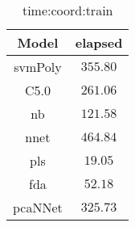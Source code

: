 \begin{table}[!ht]
	\centering
	\begin{tabular}{|c|c|}
		\hline
		Model & elapsed \\ \hline
		svmPoly & $355.80$ \\ \hline
		C5.0 & $261.06$ \\ \hline
		nb & $121.58$ \\ \hline
		nnet & $464.84$ \\ \hline
		pls & $19.05$ \\ \hline
		fda & $52.18$ \\ \hline
		pcaNNet & $325.73$ \\ \hline
	\end{tabular}
	\caption{time:coord:train}
	\label{tab:time:coord:train}
\end{table}
